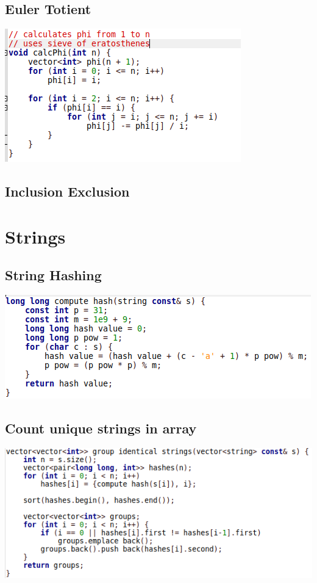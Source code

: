 \documentclass[11pt,twocolumn]{article}
\begin{document}
\subsection{Euler Totient}
\includegraphics[scale=0.5]{eulertotient}

\subsection{Inclusion Exclusion}

\section{Strings}
\subsection{String Hashing}

\includegraphics[scale=0.5]{hashing}

\subsection{Count unique strings in array}

\includegraphics[scale=0.4]{identicalstrings}
\end{document}
